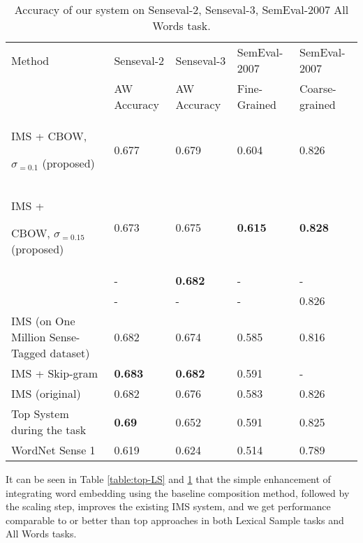 \begin{table}[th]
	\caption{Accuracy of our system on Senseval-2, Senseval-3, SemEval-2007 All Words task.}
	\label{table:All-AW}
	\begin{center}
		\begin{tabular}{| p{4cm} | p{2cm} | p{2cm} | p{2.5cm} | p{2.5cm} | }
			\hline
			Method & Senseval-2 & Senseval-3 & SemEval-2007 & 
            SemEval-2007 \\
			& AW Accuracy & AW Accuracy & Fine-Grained &
			Coarse-grained \\
			\hline
			IMS + CBOW, 
			
			$\sigma _{=0.1}$ (proposed) & 0.677 & 0.679 & 0.604 & 0.826  \\
			\hline
            IMS + 
			
			CBOW, $\sigma _{=0.15}$ (proposed) & 0.673 & 0.675 & {\bf0.615} & {\bf 0.828 } \\
			\hline
			
			\cite{Taghipour15} & -& {\bf0.682} & - & - \\
			\hline
			\cite{chen2014} & - & - & - & 0.826  \\
			\hline
			IMS (on One Million Sense-Tagged dataset) & 0.682 & 0.674 & 0.585 & 0.816 \\
            \hline
            IMS + Skip-gram \cite{Iacobacci2016}  & {\bf0.683} & {\bf0.682} & 0.591 & - \\
			\hline
			IMS (original) & 0.682 & 0.676 & 0.583 & 0.826   \\
			\hline
			Top System during the task & {\bf0.69} & 0.652 & 0.591 & 0.825  \\
			\hline
			WordNet Sense 1 & 0.619 & 0.624 & 0.514 & 0.789\\
			\hline
		\end{tabular}
	\end{center}
\end{table}


It can be seen in Table \ref{table:top-LS} and \ref{table:All-AW} that the simple enhancement of integrating word embedding using the baseline composition method, followed by the scaling step, improves the existing IMS system, and we get performance comparable to or better than top approaches in both Lexical Sample tasks and All Words tasks. 

